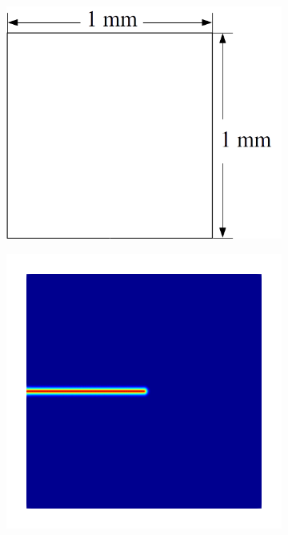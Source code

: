\begin{figure}[htb!]
    \hspace{0.015\textwidth}
    \begin{subfigure}[b]{0.21\textwidth}
        \centering
        \includegraphics[width=\textwidth,scale=0.5]{past/figures/intact_plate_dimensions.png}
        \vspace{-0.03\textwidth}
    \end{subfigure}
    \begin{subfigure}[b]{0.21\textwidth}
        \centering
        \includegraphics[width=\textwidth,scale=0.5]{past/figures/intact_plate_initial.png}

\end{subfigure}
\end{figure}
